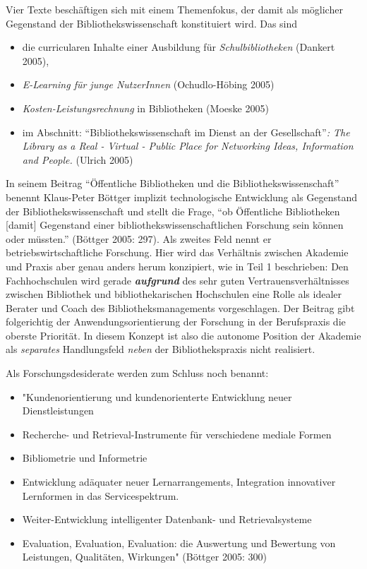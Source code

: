 \documentclass[a4paper,
fontsize=11pt,
oneside,
numbers=noperiodatend,
parskip=half-,
bibliography=totoc,
final
]{scrartcl}
\begin{document}
Vier Texte beschäftigen sich mit einem Themenfokus, der damit als
möglicher Gegenstand der Bibliothekswissenschaft konstituiert wird. Das
sind

\begin{itemize}
\item
  die curricularen Inhalte einer Ausbildung für \emph{Schulbibliotheken}
  (Dankert 2005),
\item
  \emph{E-Learning für junge NutzerInnen} (Ochudlo-Höbing 2005)
\item
  \emph{Kosten-Leistungsrechnung} in Bibliotheken (Moeske 2005)
\item
  im Abschnitt: \enquote{Bibliothekswissenschaft im Dienst an der
  Gesellschaft}\emph{: The Library as a Real - Virtual - Public Place
  for Networking Ideas, Information and People.} (Ulrich 2005)
\end{itemize}

In seinem Beitrag \enquote{Öffentliche Bibliotheken und die
Bibliothekswissenschaft} benennt Klaus-Peter Böttger implizit
technologische Entwicklung als Gegenstand der Bibliothekswissenschaft
und stellt die Frage, \enquote{ob Öffentliche Bibliotheken {[}damit{]}
Gegenstand einer bibliothekswissenschaftlichen Forschung sein können
oder müssten.} (Böttger 2005: 297). Als zweites Feld nennt er
betriebswirtschaftliche Forschung. Hier wird das Verhältnis zwischen
Akademie und Praxis aber genau anders herum konzipiert, wie in Teil 1
beschrieben: Den Fachhochschulen wird gerade \textbf{\emph{aufgrund}}
des sehr guten Vertrauensverhältnisses zwischen Bibliothek und
bibliothekarischen Hochschulen eine Rolle als idealer Berater und Coach
des Bibliotheksmanagements vorgeschlagen. Der Beitrag gibt folgerichtig
der Anwendungsorientierung der Forschung in der Berufspraxis die oberste
Priorität. In diesem Konzept ist also die autonome Position der Akademie
als \emph{separates} Handlungsfeld \emph{neben} der Bibliothekspraxis
nicht realisiert.

Als Forschungsdesiderate werden zum Schluss noch benannt:

\begin{itemize}
\item
  "Kundenorientierung und kundenorienterte Entwicklung neuer
  Dienstleistungen
\item
  Recherche- und Retrieval-Instrumente für verschiedene mediale Formen
\item
  Bibliometrie und Informetrie
\item
  Entwicklung adäquater neuer Lernarrangements, Integration innovativer
  Lernformen in das Servicespektrum.
\item
  Weiter-Entwicklung intelligenter Datenbank- und Retrievalsysteme
\item
  Evaluation, Evaluation, Evaluation: die Auswertung und Bewertung von
  Leistungen, \linebreak Qualitäten, Wirkungen" (Böttger 2005: 300)
\end{itemize}
\end{document}
